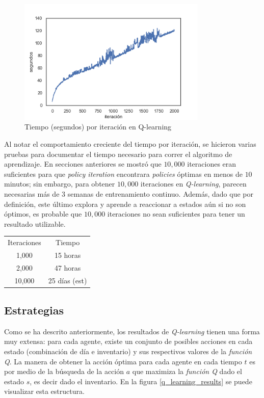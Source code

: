 \begin{figure}[H]
\caption{Tiempo (segundos) por iteraci\'on en Q-learning}
\label{q_learning_times}
\includegraphics[width=9cm]{tesis_tex/figs/q_learning_times.png}
\centering
\end{figure}

Al notar el comportamiento creciente del tiempo por iteraci\'on, se hicieron varias pruebas para documentar el tiempo necesario para correr el algoritmo de aprendizaje. En secciones anteriores se mostr\'o que $10,000$ iteraciones eran suficientes para que \textit{policy iteration} encontrara \textit{policies} \'optimas en menos de $10$ minutos; sin embargo, para obtener $10,000$ iteraciones en \textit{Q-learning}, parecen necesarias m\'as de 3 semanas de entrenamiento continuo. Adem\'as, dado que por definici\'on, este \'ultimo explora y aprende a reaccionar a estados a\'un si no son \'optimos, es probable que $10,000$ iteraciones no sean suficientes para tener un resultado utilizable.

\begin{center}
\begin{tabular}{c|c}
Iteraciones     &  Tiempo\\
1,000     &  15 horas\\
2,000     &  47 horas\\
10,000     & 25 d\'ias (est)
\end{tabular}
\end{center}

\subsection{Estrategias}

Como se ha descrito anteriormente, los resultados de \textit{Q-learning} tienen una forma muy extensa: para cada agente, existe un conjunto de posibles acciones en cada estado (combinaci\'on de d\'ia e inventario) y sus respectivos valores de la \textit{funci\'on Q}. La manera de obtener la acci\'on \'optima para cada agente en cada tiempo $t$ es por medio de la b\'usqueda de la acci\'on $a$ que maximiza la \textit{funci\'on Q} dado el estado $s$, es decir dado el inventario. En la figura \ref{q_learning_results} se puede visualizar esta estructura.\

